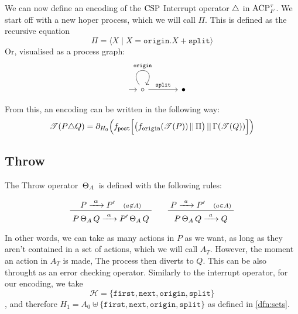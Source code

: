 \documentclass[../hons_project.tex]{subfiles}
\begin{document}
We can now define an encoding of the $\mathrm{CSP}$ Interrupt operator $\triangle$ in $\mathrm{ACP}_{F}^{\tau}$. We start off with a new hoper process, which we will call $\Pi$. This is defined as the recursive equation
\[\Pi = \langle X \mid X = \mathtt{origin}.X + \mathtt{split} \rangle\]
Or, visualised as a process graph:
\[\begin{tikzcd}[column sep=scriptsize, row sep=scriptsize]
		{} & \circ && \bullet
		\arrow[shorten <=8pt, from=1-1, to=1-2]
		\arrow["{\mathtt{origin}}", from=1-2, to=1-2, loop, in=55, out=125, distance=10mm]
		\arrow["{\mathtt{split}}", from=1-2, to=1-4]
	\end{tikzcd}\]

From this, an encoding can be written in the following way:
\[\mathscr{T}(P \triangle Q) = \partial_{H_{0}}\Bigl(f_{\mathtt{post}}\Bigl[ \bigl(f_{\mathtt{origin}}(\mathscr{T}(P)) \,\vert\vert\, \Pi\bigr) \,\vert\vert\, \Gamma(\mathscr{T}(Q)) \Bigr]\Bigr)\]
\subsection{Throw}\label{ssec:throw}

The Throw operator $\,\Theta_{A}\,$ is defined with the following rules:

\[\prftree{P \prightarrow{\alpha} P' \quad \scriptstyle(a\not\in A)}{P \throw Q \prightarrow{\alpha} P' \throw Q} \qquad \prftree{P \prightarrow{a} P' \quad \scriptstyle(a\in A)}{P \throw Q \prightarrow{a} Q }\]

In other words, we can take as many actions in $P$ as we want, as long as they aren't contained in a set of actions, which we will call $A_{T}$. However, the moment an action in $A_{T}$ is made, The process then diverts to $Q$. This can be also throught as an error checking operator. Similarly to the interrupt operator, for our encoding, we take
\[\mathscr{H} = \{\mathtt{first}, \mathtt{next}, \mathtt{origin}, \mathtt{split}\}\]
, and therefore $H_{1} = A_{0} \uplus \{\mathtt{first}, \mathtt{next}, \mathtt{origin}, \mathtt{split}\}$ as defined in \ref{dfn:sets}.
\end{document}
